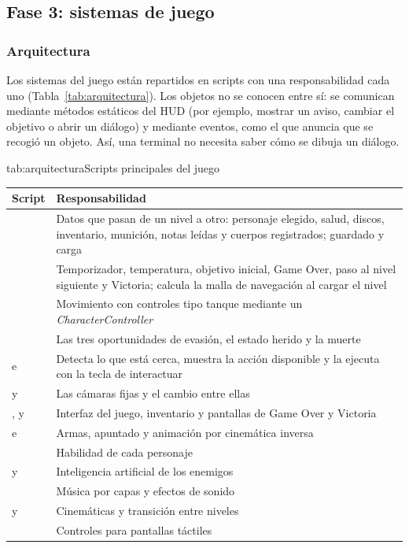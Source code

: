 \subsection{Fase 3: sistemas de juego}

\subsubsection{Arquitectura}

Los sistemas del juego están repartidos en scripts con una responsabilidad cada uno
(Tabla~\ref{tab:arquitectura}). Los objetos no se conocen entre sí: se comunican mediante métodos
estáticos del HUD (por ejemplo, mostrar un aviso, cambiar el objetivo o abrir un diálogo) y mediante
eventos, como el que anuncia que se recogió un objeto. Así, una terminal no necesita saber cómo se
dibuja un diálogo.

\begin{TablaAPA}{tab:arquitectura}{Scripts principales del juego}
\begin{tabularx}{\linewidth}{P{4.4cm}L}
\toprule
Script & Responsabilidad \\
\midrule
{} & Datos que pasan de un nivel a otro: personaje elegido, salud, discos, inventario, munición, notas leídas y cuerpos registrados; guardado y carga \\
 & Temporizador, temperatura, objetivo inicial, Game Over, paso al nivel siguiente y Victoria; calcula la malla de navegación al cargar el nivel \\
 & Movimiento con controles tipo tanque mediante un \textit{CharacterController} \\
 & Las tres oportunidades de evasión, el estado herido y la muerte \\
 e  & Detecta lo que está cerca, muestra la acción disponible y la ejecuta con la tecla de interactuar \\
 y  & Las cámaras fijas y el cambio entre ellas \\
,  y  & Interfaz del juego, inventario y pantallas de Game Over y Victoria \\
 e  & Armas, apuntado y animación por cinemática inversa \\
 & Habilidad de cada personaje \\
 y  & Inteligencia artificial de los enemigos \\
 & Música por capas y efectos de sonido \\
 y  & Cinemáticas y transición entre niveles \\
 & Controles para pantallas táctiles \\
\bottomrule
\end{tabularx}
\end{TablaAPA}

